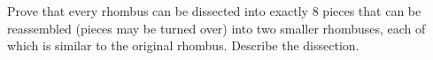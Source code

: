 Prove that every rhombus can be dissected into exactly $8$ pieces that can be reassembled (pieces may be turned over) into two smaller rhombuses, each of which is similar to the original rhombus. Describe the dissection.
